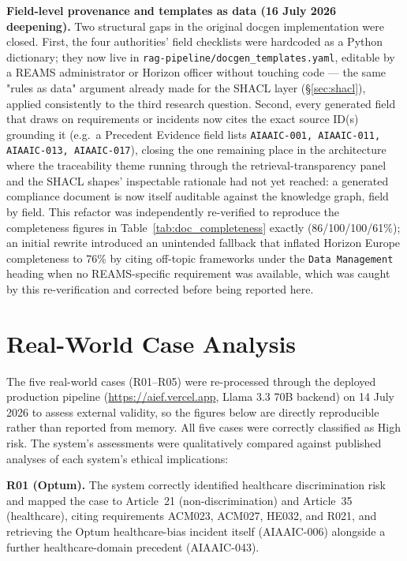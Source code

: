\textbf{Field-level provenance and templates as data (16 July 2026 deepening).} Two structural gaps in the original docgen implementation were closed. First, the four authorities' field checklists were hardcoded as a Python dictionary; they now live in \texttt{rag-pipeline/docgen\_templates.yaml}, editable by a REAMS administrator or Horizon officer without touching code --- the same "rules as data" argument already made for the SHACL layer (\S\ref{sec:shacl}), applied consistently to the third research question. Second, every generated field that draws on requirements or incidents now cites the exact source ID(s) grounding it (e.g.\ a Precedent Evidence field lists \texttt{AIAAIC-001, AIAAIC-011, AIAAIC-013, AIAAIC-017}), closing the one remaining place in the architecture where the traceability theme running through the retrieval-transparency panel and the SHACL shapes' inspectable rationale had not yet reached: a generated compliance document is now itself auditable against the knowledge graph, field by field. This refactor was independently re-verified to reproduce the completeness figures in Table~\ref{tab:doc_completeness} exactly (86/100/100/61\%); an initial rewrite introduced an unintended fallback that inflated Horizon Europe completeness to 76\% by citing off-topic frameworks under the \texttt{Data Management} heading when no REAMS-specific requirement was available, which was caught by this re-verification and corrected before being reported here.


\section{Real-World Case Analysis}

The five real-world cases (R01--R05) were re-processed through the deployed production pipeline (\url{https://aief.vercel.app}, Llama 3.3 70B backend) on 14 July 2026 to assess external validity, so the figures below are directly reproducible rather than reported from memory. All five cases were correctly classified as High risk. The system's assessments were qualitatively compared against published analyses of each system's ethical implications:

\textbf{R01 (Optum).} The system correctly identified healthcare discrimination risk and mapped the case to Article~21 (non-discrimination) and Article~35 (healthcare), citing requirements ACM023, ACM027, HE032, and R021, and retrieving the Optum healthcare-bias incident itself (AIAAIC-006) alongside a further healthcare-domain precedent (AIAAIC-043).

